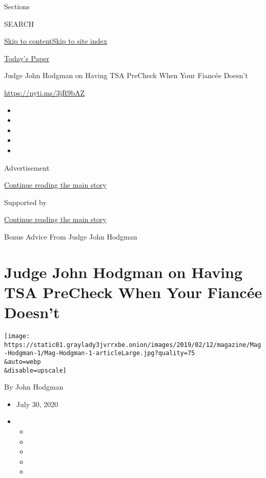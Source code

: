Sections

SEARCH

\protect\hyperlink{site-content}{Skip to
content}\protect\hyperlink{site-index}{Skip to site index}

\href{https://myaccount.nytimes3xbfgragh.onion/auth/login?response_type=cookie\&client_id=vi}{}

\href{https://www.nytimes3xbfgragh.onion/section/todayspaper}{Today's
Paper}

Judge John Hodgman on Having TSA PreCheck When Your Fiancée Doesn't

\url{https://nyti.ms/3jR9bAZ}

\begin{itemize}
\item
\item
\item
\item
\item
\end{itemize}

Advertisement

\protect\hyperlink{after-top}{Continue reading the main story}

Supported by

\protect\hyperlink{after-sponsor}{Continue reading the main story}

Bonus Advice From Judge John Hodgman

\hypertarget{judge-john-hodgman-on-having-tsa-precheck-when-your-fiancuxe9e-doesnt}{%
\section{Judge John Hodgman on Having TSA PreCheck When Your Fiancée
Doesn't}\label{judge-john-hodgman-on-having-tsa-precheck-when-your-fiancuxe9e-doesnt}}

\texttt{[image: https://static01.graylady3jvrrxbe.onion/images/2019/02/12/magazine/Mag-Hodgman-1/Mag-Hodgman-1-articleLarge.jpg?quality=75\\\&auto=webp\\\&disable=upscale]}

By John Hodgman

\begin{itemize}
\item
  July 30, 2020
\item
  \begin{itemize}
  \item
  \item
  \item
  \item
  \item
  \end{itemize}
\end{itemize}

